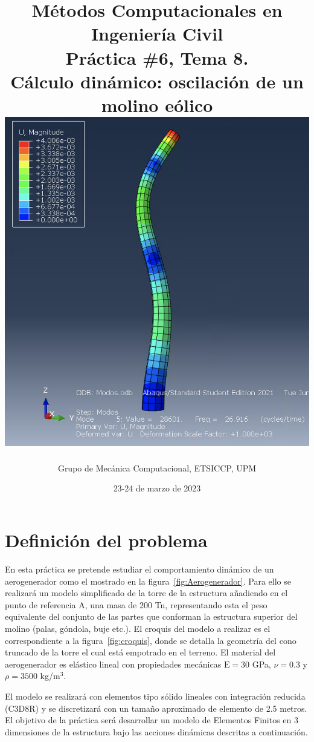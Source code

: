 \documentclass[spanish,a4paper,12pt]{article}
\title{\vspace*{-4ex}
	\bf\normalsize
	Métodos Computacionales en Ingenierí­a Civil\\
	\Large
	Práctica \#6, Tema 8.\\
	Cálculo dinámico: oscilación de un molino eólico\\[3ex]
	\includegraphics[scale=0.40]{fp6/molino_modo5}
	}
\author{
        {\small\sc 
	Grupo de Mecánica Computacional, ETSICCP, UPM}}
\date{23-24 de marzo de 2023}
\begin{document}
\pagestyle{fancy}
\lhead[\fancyplain{}{\thepage}]{\fancyplain{}{\rightmark}}
\rhead[\fancyplain{}{\leftmark}]{\fancyplain{}{\thepage}}
\cfoot[\fancyplain{\thepage}{}]{\fancyplain{\thepage}{}}

\renewcommand{\sectionmark}[1]{\markright{\sf Aptdo.\ \thesection. #1}{}}


\maketitle

\tableofcontents


\section{Definición del problema}
\label{sec:problema}
En esta práctica se pretende estudiar el comportamiento dinámico de un aerogenerador como el mostrado en la figura~\ref{fig:Aerogenerador}. Para ello se realizará un modelo simplificado de la torre de la estructura añadiendo en el punto de referencia A, una masa de  200 Tn, representando esta el peso equivalente del conjunto de las partes que conforman la estructura superior del molino (palas, góndola, buje etc.). El croquis del modelo a realizar es el correspondiente a la figura~\ref{fig:croquis}, donde se detalla la geometrí­a del cono truncado de la torre el cual está empotrado en el terreno.  El material del aerogenerador es elástico lineal con propiedades mecánicas $\text{E}=30$ GPa, $\nu=0.3$ y $\rho=3500$ kg/m$^3$.

El modelo se realizará con elementos tipo sólido lineales con integración reducida (C3D8R) y se discretizará con un tamaño aproximado de elemento de 2.5 metros. El objetivo de la práctica será desarrollar un modelo de Elementos Finitos en 3 dimensiones de la estructura bajo las acciones dinámicas descritas a continuación.
\end{document}
